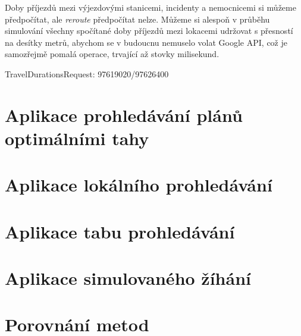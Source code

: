 Doby příjezdů mezi výjezdovými stanicemi, incidenty a nemocnicemi si můžeme předpočítat, ale \textit{reroute} předpočítat nelze.
Můžeme si alespoň v průběhu simulování všechny spočítané doby příjezdů mezi lokacemi udržovat s přesností na desítky metrů,
abychom se v budoucnu nemuselo volat Google API, což je samozřejmě pomalá operace, trvající až stovky milisekund. 

TravelDurationsRequest: 97619020/97626400


\section{Aplikace prohledávání plánů optimálními tahy}

\section{Aplikace lokálního prohledávání}

\section{Aplikace tabu prohledávání}

\section{Aplikace simulovaného žíhání}

\section{Porovnání metod}

